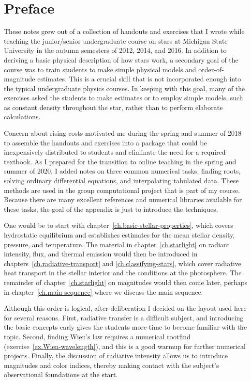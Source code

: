 
\section*{Preface}
These notes grew out of a collection of handouts and exercises that I wrote while teaching the junior/senior undergraduate course on stars at Michigan State University in the autumn semesters of 2012, 2014, and 2016. In addition to deriving a basic physical description of how stars work, a secondary goal of the course was to train students to make simple physical models and order-of-magnitude estimates. This is a crucial skill that is not incorporated enough into the typical undergraduate physics courses. In keeping with this goal, many of the exercises asked the students to make estimates or to employ simple models, such as constant density throughout the star, rather than to perform elaborate calculations.

Concern about rising costs motivated me during the spring and summer of 2018 to assemble the handouts and exercises into a package that could be inexpensively distributed to students and eliminate the need for a required textbook. As I prepared for the transition to online teaching in the spring and summer of 2020, I added notes on three common numerical tasks: finding roots, solving ordinary differential equations, and interpolating tabulated data. These methods are used in the group computational project that is part of my course. Because there are many excellent references and numerical libraries available for these tasks, the goal of the appendix is just to introduce the techniques.

 One would be to start with chapter~\ref{ch.basic-stellar-properties}, which covers hydrostatic equilibrium and establishes estimates for the mean stellar density, pressure, and temperature. The material in chapter~\ref{ch.starlight} on radiant intensity, flux, and thermal emission would then be introduced in chapters~\ref{ch.radiative-transport} and \ref{ch.classifying-stars}, which cover radiative heat transport in the stellar interior and the conditions at the photosphere. The remainder of chapter~\ref{ch.starlight} on magnitudes would then come later, perhaps in chapter~\ref{ch.main-sequence} where we discuss the main sequence.

Although this order is logical, after deliberation I decided on the layout used here for several reasons. First, radiative transfer is a difficult subject, and introducing the basic concepts early gives the students more time to become familiar with the topic. Second, finding Wien's law requires a numerical rootfind (exercise~\ref{ex.Wien-wavelength}), and this is a good warmup for further numerical projects. Finally, the discussion of radiative intensity allows us to introduce magnitudes and color indices, thereby making contact with the subject's observational foundations at the start.


